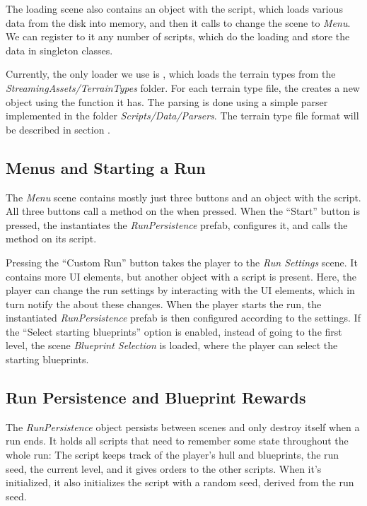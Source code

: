 The loading scene also contains an object with the  script, which loads various data from the disk into memory, and then it calls to change the scene to \emph{Menu}.
We can register to it any number of  scripts, which do the loading and store the data in singleton classes.

Currently, the only loader we use is , which loads the terrain types from the \emph{StreamingAssets/TerrainTypes} folder.
For each terrain type file, the  creates a new  object using the function  it has.
The parsing is done using a simple parser implemented in the folder \emph{Scripts/Data/Parsers}.
The terrain type file format will be described in section .

\subsection{Menus and Starting a Run}

The \emph{Menu} scene contains mostly just three buttons and an object with the  script.
All three buttons call a method on the  when pressed.
When the \enquote{Start} button is pressed, the  instantiates the \emph{RunPersistence} prefab, configures it, and calls the  method on its  script.

Pressing the \enquote{Custom Run} button takes the player to the \emph{Run Settings} scene.
It contains more UI elements, but another object with a  script is present.
Here, the player can change the run settings by interacting with the UI elements, which in turn notify the  about these changes.
When the player starts the run, the instantiated \emph{RunPersistence} prefab is then configured according to the settings.
If the \enquote{Select starting blueprints} option is enabled, instead of going to the first level, the scene \emph{Blueprint Selection} is loaded, where the player can select the starting blueprints.

\subsection{Run Persistence and Blueprint Rewards}

The \emph{RunPersistence} object persists between scenes and only destroy itself when a run ends.
It holds all scripts that need to remember some state throughout the whole run:
The  script keeps track of the player's hull and blueprints, the run seed, the current level, and it gives orders to the other scripts.
When it's initialized, it also initializes the  script with a random seed, derived from the run seed.

